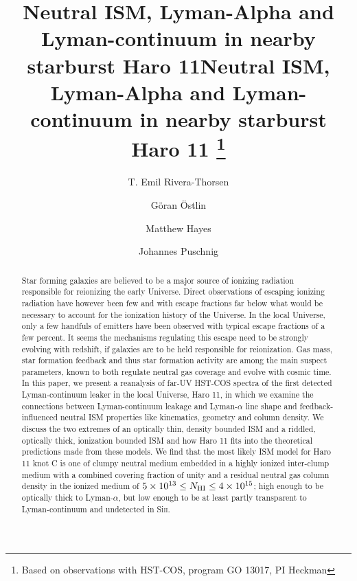 \documentclass[twocolumn]{aastex61}
\begin{document}
\title{Neutral ISM, Lyman-Alpha and Lyman-continuum in nearby starburst Haro 11}

\title{Neutral ISM, Lyman-Alpha and Lyman-continuum in nearby starburst Haro 11
		                    \footnote{Based on observations with HST-COS, program GO 13017, PI Heckman}
	            }
%

\author{T. Emil Rivera-Thorsen}
\author{Göran Östlin}
\author{Matthew Hayes}
\author{Johannes Puschnig}


\begin{abstract}
Star forming galaxies are believed to be a major source of ionizing
radiation responsible for reionizing the early Universe. Direct
observations of escaping ionizing radiation have however been few and
with escape fractions far below what would be necessary to account for
the ionization history of the Universe. In the local Universe, only a
few handfuls of emitters have been observed with typical escape
fractions of a few percent. It seems the mechanisms regulating this
escape need to be strongly evolving with redshift, if galaxies are to be
held responsible for reionization. Gas mass, star formation feedback and
thus star formation activity are among the main suspect parameters,
known to both regulate neutral gas coverage and evolve with cosmic time.
In this paper, we present a reanalysis of far-UV HST-COS spectra of the
first detected Lyman-continuum leaker in the local Universe, Haro 11, in
which we examine the connections between Lyman-continuum leakage and
Lyman-$\alpha$ line shape and feedback-influenced neutral ISM properties
like kinematics, geometry and column density. We discuss the two
extremes of an optically thin, density bounded ISM and a riddled,
optically thick, ionization bounded ISM and how Haro 11 fits into the
theoretical predictions made from these models. We find that the most
likely ISM model for Haro 11 knot C is one of clumpy neutral medium
embedded in a highly ionized inter-clump medium with a combined covering
fraction of unity and a residual neutral gas column density in the
ionized medium of
$5 \times 10^{13} \leq N_{\rm HI} \leq 4 \times 10^{15}$; high enough to
be optically thick to Lyman-$\alpha$, but low enough to be at least
partly transparent to Lyman-continuum and undetected in Si\textsc{ii}.
\end{abstract}
\end{document}
